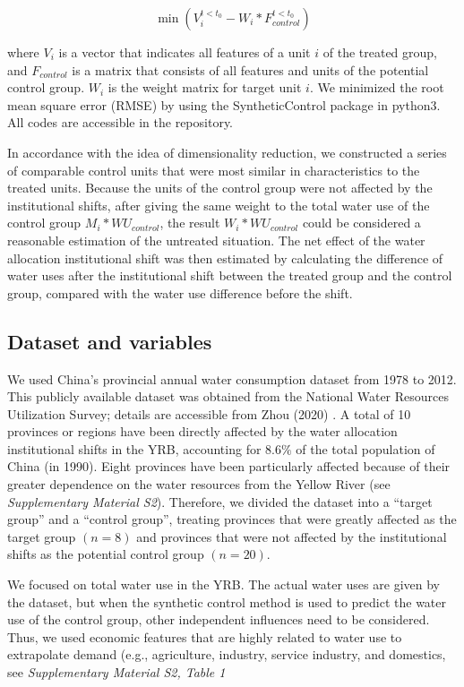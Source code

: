 $$\min(V_{i}^{t<t_0} - W_i * F_{control}^{t<t_0})$$

where $V_i$ is a vector that indicates all features of a unit $i$ of the treated group, and $F_{control}$ is a matrix that consists of all features and units of the potential control group. $W_i$ is the weight matrix for target unit $i$. We minimized the root mean square error (RMSE) by using the SyntheticControl package in python3. All codes are accessible in the repository.

In accordance with the idea of dimensionality reduction, we constructed a series of comparable control units that were most similar in characteristics to the treated units. Because the units of the control group were not affected by the institutional shifts, after giving the same weight to the total water use of the control group $M_i * WU_{control}$, the result $W_i*WU_{control}$ could be considered a reasonable estimation of the untreated situation. The net effect of the water allocation institutional shift was then estimated by calculating the difference of water uses after the institutional shift between the treated group and the control group, compared with the water use difference before the shift.

\subsection{Dataset and variables}
We used China’s provincial annual water consumption dataset from 1978 to 2012. This publicly available dataset was obtained from the National Water Resources Utilization Survey; details are accessible from Zhou (2020) \cite{zhou2020}.
A total of 10 provinces or regions have been directly affected by the water allocation institutional shifts in the YRB, accounting for $8.6\%$ of the total population of China (in 1990). Eight provinces have been particularly affected because of their greater dependence on the water resources from the Yellow River (see \textit{Supplementary Material S2}). Therefore, we divided the dataset into a “target group” and a “control group”, treating provinces that were greatly affected as the target group $(n=8)$ and provinces that were not affected by the institutional shifts as the potential control group $(n=20)$.

We focused on total water use in the YRB. The actual water uses are given by the dataset, but when the synthetic control method is used to predict the water use of the control group, other independent influences need to be considered. Thus, we used economic features that are highly related to water use to extrapolate demand (e.g., agriculture, industry, service industry, and domestics, see \textit{Supplementary Material S2, Table 1}

